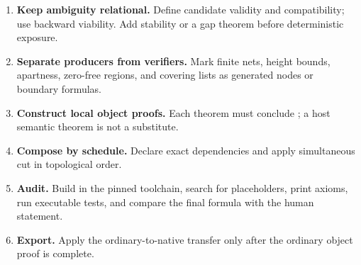 \begin{enumerate}[label=\textbf{\arabic*.},leftmargin=3em]
\item \textbf{Keep ambiguity relational.}  Define candidate validity and compatibility;
use backward viability.  Add stability or a gap theorem before deterministic exposure.

\item \textbf{Separate producers from verifiers.}  Mark finite nets, height bounds,
apartness, zero-free regions, and covering lists as generated nodes or boundary
formulas.

\item \textbf{Construct local object proofs.}  Each theorem must conclude
; a host semantic theorem is not a substitute.

\item \textbf{Compose by schedule.}  Declare exact dependencies and apply simultaneous
cut in topological order.

\item \textbf{Audit.}  Build in the pinned toolchain, search for placeholders, print
axioms, run executable tests, and compare the final formula with the human statement.

\item \textbf{Export.}  Apply the ordinary-to-native transfer only after the ordinary
object proof is complete.
\end{enumerate}
